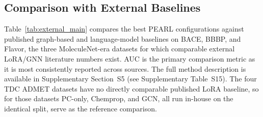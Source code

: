 \documentclass[pdflatex,sn-basic]{sn-jnl}%
\begin{document}
\FloatBarrier
\subsection{Comparison with External Baselines}\label{sec:external_comparison}
Table~\ref{tab:external_main} compares the best PEARL configurations against published graph-based and language-model baselines on BACE, BBBP, and Flavor, the three MoleculeNet-era datasets for which comparable external LoRA/GNN literature numbers exist. AUC is the primary comparison metric as it is most consistently reported across sources. The full method description is available in Supplementary Section~S5 (see Supplementary Table~S15). The four TDC ADMET datasets have no directly comparable published LoRA baseline, so for those datasets PC-only, Chemprop, and GCN, all run in-house on the identical split, serve as the reference comparison.
\end{document}
